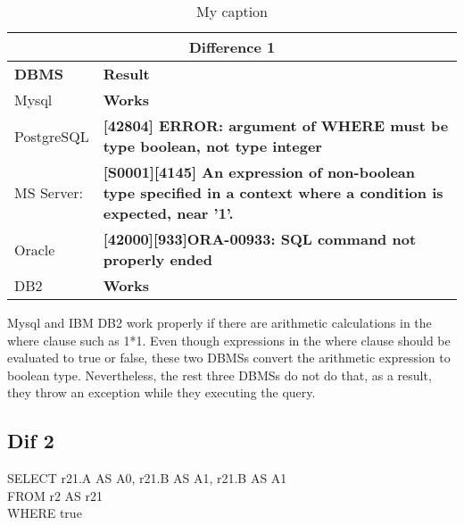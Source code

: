 \begin{table}[h]
\centering
\caption{My caption}
\label{my-label}
\begin{tabular}{|p{2cm}|p{12cm}|}
\hline
\multicolumn{2}{|c|}{\textbf{Difference 1}}                                                                                                                             \\ \hline
\textbf{DBMS} & \textbf{Result}                                                                                                                                         \\ \hline
Mysql         & {\color[HTML]{009901} \textbf{Works}}                                                                                                                   \\ \hline
PostgreSQL    & {\color[HTML]{FE0000} \textbf{{[}42804{]} ERROR: argument of WHERE must be type boolean, not type integer}}                                             \\ \hline
MS Server:    & {\color[HTML]{FE0000} \textbf{{[}S0001{]}{[}4145{]} An expression of non-boolean type specified in a context where a condition is expected, near '1'.}} \\ \hline
Oracle        & {\color[HTML]{FE0000} \textbf{{[}42000{]}{[}933{]}ORA-00933: SQL command not properly ended}}                                                           \\ \hline
DB2           & {\color[HTML]{009901} \textbf{Works}}                                                                                                                   \\ \hline
\end{tabular}
\end{table}


Mysql and IBM DB2 work properly if there are arithmetic calculations in the where clause such as 1*1. Even though expressions in the where clause should be evaluated to true or false, these two DBMSs convert the arithmetic expression to boolean type. Nevertheless, the rest three DBMSs do not do that, as a result, they throw an exception while they executing the query.    


\subsection{Dif 2}
  
\begin{mdframed}[backgroundcolor=gray!20] 
SELECT r21.A AS A0, r21.B AS A1, r21.B AS A1
\\FROM r2 AS r21
\\WHERE true
\end{mdframed}

